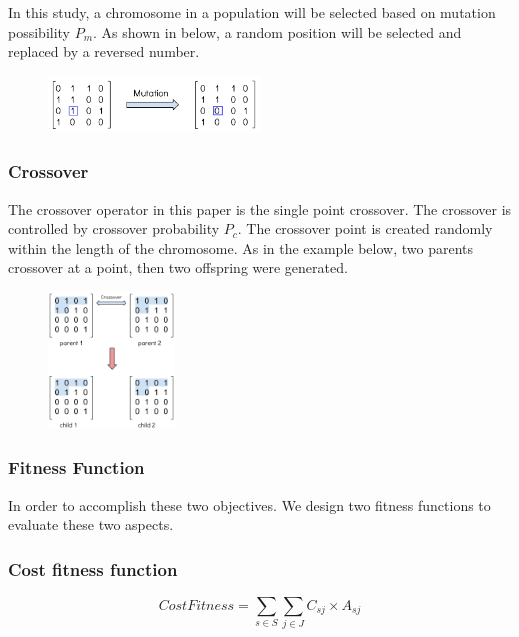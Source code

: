 \documentclass{llncs}
\begin{document}
In this study, a chromosome in a population will be selected based on mutation possibility $P_{m}$. 
As shown in below, a random position will be selected and replaced by a reversed number.
\begin{figure}[ht]
\centering
	\includegraphics[width=0.5\textwidth]{pics/mutation.png}
\caption{}
\label{graph1}
\end{figure}
\subsubsection{Crossover}
The crossover operator in this paper is the single point crossover. 
The crossover is controlled by crossover probability $P_{c}$. 
The crossover point is created randomly within the length of the chromosome. 
As in the example below, two parents crossover at a point, then two offspring were generated.
\begin{figure}[ht]
\centering
	\includegraphics[width=0.3\textwidth]{pics/crossover.png}
\caption{}
\label{graph2}
\end{figure}

\subsubsection{Fitness Function}

\begin{flushleft}In order to accomplish these two objectives. We design two fitness functions to evaluate these two aspects.\end{flushleft}
\subsubsection{Cost fitness function}
\begin{center}
	\begin{equation}
		CostFitness = \sum\limits_{s \in S} \sum\limits_{j \in J} C_{sj} \times A_{sj}
	\end{equation}
\end{center}
\end{document}
